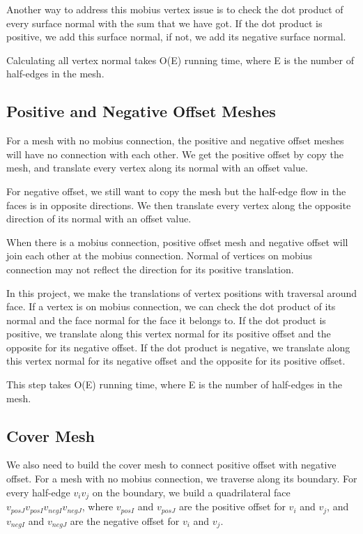 \documentclass[12pt]{article}
\begin{document}
Another way to address this mobius vertex issue is to check the dot product of every surface normal with the sum that we have got. If the dot product is positive, we add this surface normal, if not, we add its negative surface normal.

Calculating all vertex normal takes O(E) running time, where E is the number of half-edges in the mesh.

\subsection{Positive and Negative Offset Meshes}

For a mesh with no mobius connection, the positive and negative offset meshes will have no connection with each other. We get the positive offset by copy the mesh, and translate every vertex along its normal with an offset value. 

For negative offset, we still want to copy the mesh but the half-edge flow in the faces is in opposite directions. We then translate every vertex along the opposite direction of its normal with an offset value.

When there is a mobius connection, positive offset mesh and negative offset will join each other at the mobius connection. Normal of vertices on mobius connection may not reflect the direction for its positive translation. 

In this project, we make the translations of vertex positions with traversal around face. If a vertex is on mobius connection, we can check the dot product of its normal and the face normal for the face it belongs to. If the dot product is positive, we translate along this vertex normal for its positive offset and the opposite for its negative offset. If the dot product is negative, we translate along this vertex normal for its negative offset and the opposite for its positive offset.

This step takes O(E) running time, where E is the number of half-edges in the mesh.

\subsection{Cover Mesh}

We also need to build the cover mesh to connect positive offset with negative offset. For a mesh with no mobius connection, we traverse along its boundary. For every half-edge $v_iv_j$ on the boundary, we build a quadrilateral face $v_{posJ}v_{posI}v_{negI}v_{negJ}$, where $v_{posI}$ and $v_{posJ}$ are the positive offset for $v_i$ and $v_j$, and $v_{negI}$ and $v_{negJ}$ are the negative offset for $v_i$ and $v_j$.
\end{document}
